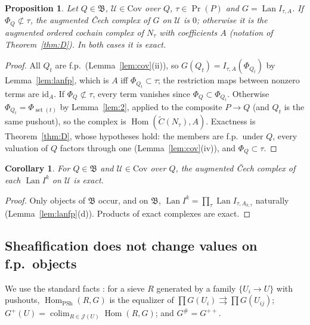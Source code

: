 \documentclass[11pt]{article}
\newtheorem{proposition}[theorem]{Proposition}
\newtheorem{corollary}[theorem]{Corollary}
\theoremstyle{definition}
\theoremstyle{remark}
\newcommand{\Prin}{\operatorname{Pr}}
\newcommand{\Hom}{\operatorname{Hom}}
\newcommand{\Lan}{\operatorname{Lan}}
\newcommand{\colim}{\operatorname*{colim}}
\newcommand{\Cov}{\mathrm{Cov}}
\newcommand{\fB}{\mathfrak{B}}
\newcommand{\cJ}{\mathcal{J}}
\newcommand{\cU}{\mathcal{U}}
\newcommand{\PSh}{\operatorname{PSh}}
\newcommand{\set}{\operatorname{set}}
\begin{document}
\begin{proposition}\label{prop:cech}
Let $Q\in\fB$, $\cU\in\Cov$ over $Q$, $\tau\in\Prin(P)$ and $G=\Lan I_{\tau,A}$. If $\Phi_Q\not\subset\tau$, the augmented Čech complex of $G$ on $\cU$ is $0$; otherwise it is the augmented ordered cochain complex of $N_\tau$ with coefficients $A$ (notation of Theorem~\ref{thm:D}). In both cases it is exact.
\end{proposition}
\begin{proof}
All $Q_t$ are f.p.\ (Lemma~\ref{lem:cov}(ii)), so $G(Q_t)=I_{\tau,A}(\Phi_{Q_t})$ by Lemma~\ref{lem:lanfp}, which is $A$ iff $\Phi_{Q_t}\subset\tau$; the restriction maps between nonzero terms are $\mathrm{id}_A$. If $\Phi_Q\not\subset\tau$, every term vanishes since $\Phi_Q\subset\Phi_{Q_t}$. Otherwise $\Phi_{Q_t}=\Phi_{\set(t)}$ by Lemma~\ref{lem:2}, applied to the composite $P\to Q$ (and $Q_t$ is the same pushout), so the complex is $\Hom(\tilde C(N_\tau),A)$. Exactness is Theorem~\ref{thm:D}, whose hypotheses hold: the members are f.p.\ under $Q$, every valuation of $Q$ factors through one (Lemma~\ref{lem:cov}(iv)), and $\Phi_Q\subset\tau$.
\end{proof}

\begin{corollary}\label{cor:cech}
For $Q\in\fB$ and $\cU\in\Cov$ over $Q$, the augmented Čech complex of each $\Lan I^k$ on $\cU$ is exact.
\end{corollary}
\begin{proof}
Only objects of $\fB$ occur, and on $\fB$, $\Lan I^k=\prod_\tau\Lan I_{\tau,A_{k,\tau}}$ naturally (Lemma~\ref{lem:lanfp}(d)). Products of exact complexes are exact.
\end{proof}

\subsection{Sheafification does not change values on f.p.\ objects}
We use the standard facts \cite[Exp.~II, \S3]{SGA4}: for a sieve $R$ generated by a family $\{U_i\to U\}$ with pushouts, $\Hom_{\PSh}(R,G)$ is the equalizer of $\prod G(U_i)\rightrightarrows\prod G(U_{ij})$; $G^+(U)=\colim_{R\in\cJ(U)}\Hom(R,G)$; and $G^\#=G^{++}$.
\end{document}
